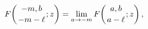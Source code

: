 \[\mathop{F\/}\nolimits\!\left({-m,b\atop-m-\ell};z\right)=\lim_{a\to-m}\mathop{%
F\/}\nolimits\!\left({a,b\atop a-\ell};z\right),\]
